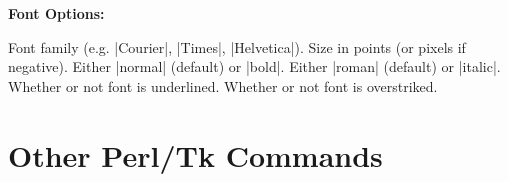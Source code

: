 {\bf Font Options:}
\begin{enum}{4.5cm}
Font family (e.g. |Courier|, |Times|, |Helvetica|).
Size in points (or pixels if negative).
Either |normal| (default) or |bold|.
Either |roman| (default) or |italic|.
Whether or not font is underlined.
Whether or not font is overstriked.

\end{enum}


\section{Other Perl/Tk Commands}

